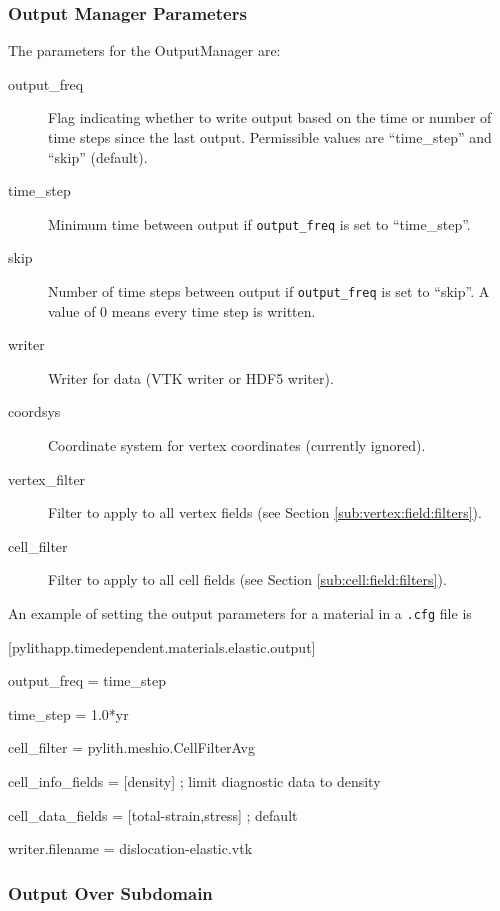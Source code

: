 \subsubsection{Output Manager Parameters}

The parameters for the OutputManager are:
\begin{description}
\item [{output\_freq}] Flag indicating whether to write output based on
the time or number of time steps since the last output. Permissible
values are ``time\_step'' and ``skip'' (default).
\item [{time\_step}] Minimum time between output if \texttt{output\_freq}
is set to ``time\_step''.
\item [{skip}] Number of time steps between output if \texttt{output\_freq}
is set to ``skip''. A value of 0 means every time step is written.
\item [{writer}] Writer for data (VTK writer or HDF5 writer).
\item [{coordsys}] Coordinate system for vertex coordinates (currently
ignored).
\item [{vertex\_filter}] Filter to apply to all vertex fields (see Section
\vref{sub:vertex:field:filters}).
\item [{cell\_filter}] Filter to apply to all cell fields (see Section
\vref{sub:cell:field:filters}).
\end{description}
An example of setting the output parameters for a material in a \texttt{.cfg}
file is
\begin{lyxcode}
{[}pylithapp.timedependent.materials.elastic.output{]}

output\_freq = time\_step

time\_step = 1.0{*}yr

cell\_filter = pylith.meshio.CellFilterAvg

cell\_info\_fields = {[}density{]} ; limit diagnostic data to density

cell\_data\_fields = {[}total-strain,stress{]} ; default

writer.filename = dislocation-elastic.vtk
\end{lyxcode}

\subsubsection{Output Over Subdomain}


